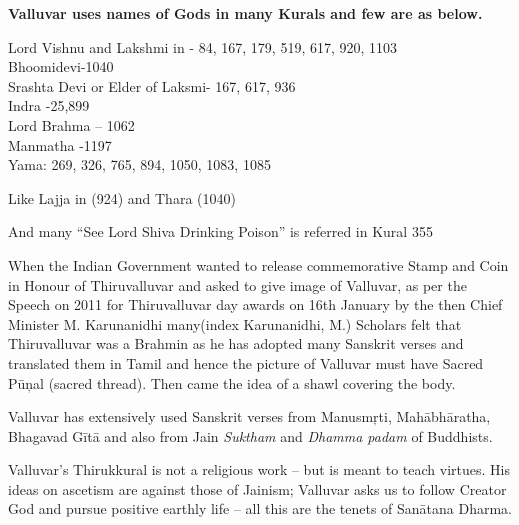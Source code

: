 \textbf{Valluvar uses names of Gods in many Kurals and few are as below.}

Lord Vishnu and Lakshmi in - 84, 167, 179, 519, 617, 920, 1103\\ Bhoomidevi-1040\\ Srashta Devi or Elder of Laksmi- 167, 617, 936\\ Indra -25,899\\ Lord Brahma – 1062\\ Manmatha -1197\\ Yama: 269, 326, 765, 894, 1050, 1083, 1085

Like Lajja in  (924) and Thara  (1040)

And many “See Lord Shiva Drinking Poison” is referred in Kural 355

When the Indian Government wanted to release commemorative Stamp and Coin in Honour of Thiruvalluvar and asked to give image of Valluvar, as per the Speech on 2011 for Thiruvalluvar day awards on 16th January by the then Chief Minister M. Karunanidhi many(index Karunanidhi, M.) Scholars felt that Thiruvalluvar was a Brahmin as he has adopted many Sanskrit verses and translated them in Tamil and hence the picture of Valluvar must have Sacred Pūņal (sacred thread). Then came the idea of a shawl covering the body.

Valluvar has extensively used Sanskrit verses from Manusmŗti, Mahābhāratha, Bhagavad Gītā and also from Jain \textit{Suktham} and \textit{Dhamma padam} of Buddhists.

Valluvar’s Thirukkural is not a religious work – but is meant to teach virtues. His ideas on ascetism are against those of Jainism; Valluvar asks us to follow Creator God and pursue positive earthly life -- all this are the tenets of Sanātana Dharma.

\newpage

\theendnotes

